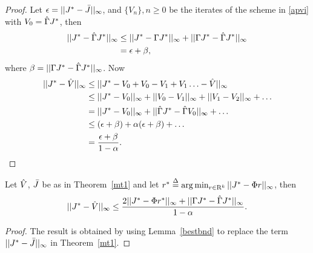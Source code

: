 \begin{proof}
Let $\epsilon=||J^*-\bar{J}||_\infty$, and $\{V_n\},n\geq 0$ be the iterates of the scheme in \eqref{apvi} with $V_0=\hat{\Gamma} J^*$, then
\begin{align}
||J^*-\hg J^*||_\infty&\leq||J^*-\Gamma J^*||_\infty+||\Gamma J^*-\hg J^*||_\infty\nn\\\vspace{10pt}
&= \epsilon+\beta,
\end{align}
where $\beta=||\Gamma J^*-\hat{\Gamma} J^*||_\infty$. Now
\begin{align}
||J^*-\hv||_\infty&\leq ||J^*-V_0+V_0-V_1+V_1\ldots-\hv||_\infty\nn\\
&\leq ||J^*-V_0||_\infty+||V_0-V_1||_\infty+||V_1-V_2||_\infty+\ldots\nn\\
&=||J^*-V_0||_\infty+||\hg J^*-\hg V_0||_\infty+\ldots\nn\\\vspace{10pt}
&\leq (\epsilon+\beta)+\alpha(\epsilon+\beta)+\ldots\nn\\
&=\frac{\epsilon+\beta}{1-\alpha}.
\end{align}
\end{proof}

\begin{corollary}\label{cmt1}
Let $\hat{V}$, $\bar{J}$ be as in Theorem~\ref{mt1} and let $r^*\stackrel{\Delta}{=}\arg\min_{r\in \mathrm{R}^k}||J^*-\Phi r||_\infty$, then
\begin{align}
||J^*-\hat{V}||_\infty\leq \frac{2||J^*-\Phi r^*||_\infty+||\Gamma J^*-\hat{\Gamma} J^*||_\infty}{1-\alpha}.
\end{align}
\end{corollary}
\begin{proof}
The result is obtained by using Lemma~\ref{bestbnd} to replace the term $||J^*-\bar{J}||_\infty$ in Theorem~\ref{mt1}.
\end{proof}
